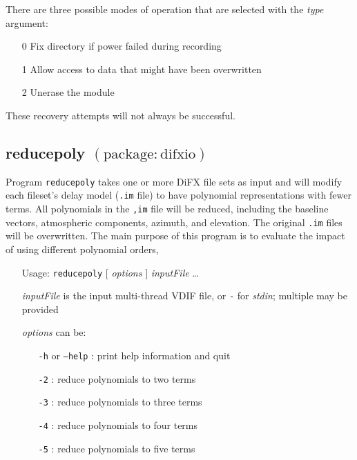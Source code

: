 \noindent
There are three possible modes of operation that are selected with the {\em type} argument:
\begin{itemize}
\item[0] Fix directory if power failed during recording
\item[1] Allow access to data that might have been overwritten
\item[2] Unerase the module
\end{itemize}
These recovery attempts will not always be successful.






\subsection{reducepoly {\small $\mathrm{(package: difxio)}$}} \label{sec:reducepoly}

Program {\tt reducepoly} takes one or more DiFX file sets as input and will modify each fileset's delay model ({\tt .im} file) to have polynomial representations with fewer terms.
All polynomials in the {\tt ,im} file will be reduced, including the baseline vectors, atmospheric components, azimuth, and elevation.
The original {\tt .im} files will be overwritten.
The main purpose of this program is to evaluate the impact of using different polynomial orders,

\begin{itemize}
\item[] Usage: {\tt reducepoly} $ [ $ {\em options} $ ] $ {\em inputFile} \ldots
\item[] {\em inputFile} is the input multi-thread VDIF file, or {\tt -} for {\em stdin}; multiple may be provided
\item[] {\em options} can be:
\begin{itemize}
\item[] {\tt -h} or {\tt --help} : print help information and quit
\item[] {\tt -2} : reduce polynomials to two terms
\item[] {\tt -3} : reduce polynomials to three terms
\item[] {\tt -4} : reduce polynomials to four terms
\item[] {\tt -5} : reduce polynomials to five terms
\end{itemize}
\end{itemize}


